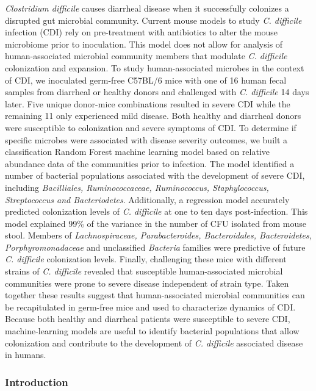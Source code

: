 \documentclass[11pt,]{article}
\begin{document}
\emph{Clostridium difficile} causes diarrheal disease when it
successfully colonizes a disrupted gut microbial community. Current
mouse models to study \emph{C. difficile} infection (CDI) rely on
pre-treatment with antibiotics to alter the mouse microbiome prior to
inoculation. This model does not allow for analysis of human-associated
microbial community members that modulate \emph{C. difficile}
colonization and expansion. To study human-associated microbes in the
context of CDI, we inoculated germ-free C57BL/6 mice with one of 16
human fecal samples from diarrheal or healthy donors and challenged with
\emph{C. difficile} 14 days later. Five unique donor-mice combinations
resulted in severe CDI while the remaining 11 only experienced mild
disease. Both healthy and diarrheal donors were susceptible to
colonization and severe symptoms of CDI. To determine if specific
microbes were associated with disease severity outcomes, we built a
classification Random Forest machine learning model based on relative
abundance data of the communities prior to infection. The model
identified a number of bacterial populations associated with the
development of severe CDI, including \emph{Bacilliales, Ruminococcaceae,
Ruminococcus, Staphylococcus, Streptococcus and Bacteriodetes}.
Additionally, a regression model accurately predicted colonization
levels of \emph{C. difficile} at one to ten days post-infection. This
model explained 99\% of the variance in the number of CFU isolated from
mouse stool. Members of \emph{Lachnospiraceae, Parabacteroides,
Bacteroidales, Bacteroidetes, Porphyromonadaceae} and unclassified
\emph{Bacteria} families were predictive of future \emph{C. difficile}
colonization levels. Finally, challenging these mice with different
strains of \emph{C. difficile} revealed that susceptible
human-associated microbial communities were prone to severe disease
independent of strain type. Taken together these results suggest that
human-associated microbial communities can be recapitulated in germ-free
mice and used to characterize dynamics of CDI. Because both healthy and
diarrheal patients were susceptible to severe CDI, machine-learning
models are useful to identify bacterial populations that allow
colonization and contribute to the development of \emph{C. difficile}
associated disease in humans.

\newpage

\subsubsection{Introduction}\label{introduction}
\end{document}
